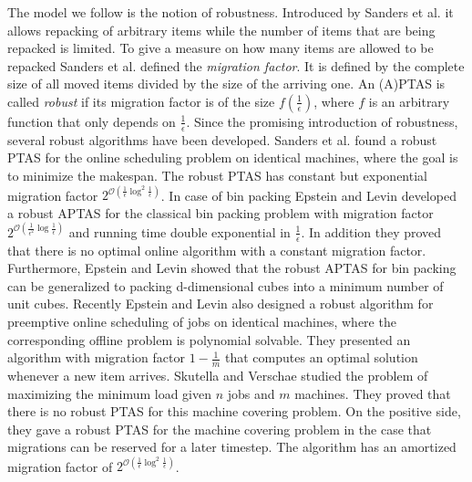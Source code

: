 \documentclass[a4paper,11pt]{article}
\begin{document}
The model we follow is the notion of robustness. Introduced by Sanders et al. \cite{sanders2009} it allows 
repacking of arbitrary items while the number of items that are being repacked is limited. To give a measure 
on how many items are allowed to
be repacked Sanders et al. \cite{sanders2009} defined the \emph{migration factor}.
It is defined by the complete size of all moved items divided by the size of the arriving one.
An (A)PTAS is called \emph{robust} if its migration factor is of the size $f(\frac{1}{\epsilon})$, where $f$ is
an arbitrary function that only depends on $\frac{1}{\epsilon}$.
Since the promising introduction of robustness, several robust algorithms have been developed.
Sanders et al. \cite{sanders2009} found a robust PTAS for the online scheduling problem  
on identical machines, where the goal is to minimize the makespan. The robust PTAS has
constant but exponential migration factor $2^{\mathcal{O}(\frac{1}{\epsilon} \log^2 \frac{1}{\epsilon})}$.
In case of bin packing
Epstein and Levin \cite{epstein2006robust} developed a robust APTAS for the classical bin packing problem
with migration factor $2^{\mathcal{O}(\frac{1}{\epsilon^2} \log \frac{1}{\epsilon})}$ and running time
double exponential in $\frac{1}{\epsilon}$.
In addition they proved that there is no optimal online algorithm with a constant migration factor.
Furthermore, Epstein and Levin \cite{epsteinu} showed that the robust APTAS for bin packing can 
be generalized to packing d-dimensional cubes into a minimum number of unit cubes.
Recently Epstein and Levin \cite{epstein2011} also designed a robust 
algorithm for preemptive online
scheduling of jobs on identical machines, where the corresponding offline problem is polynomial solvable.
They presented an algorithm with migration factor
$1-\frac{1}{m}$ that computes an optimal solution whenever a new item arrives.
Skutella and Verschae \cite{skutella2010} studied the problem of maximizing the minimum load given 
$n$ jobs and $m$ machines. They proved that there is no robust PTAS for this machine covering problem.
On the positive side, they gave a robust PTAS for the machine covering problem in the case that
migrations can be reserved for a later timestep. The algorithm has an amortized migration factor of
$2^{\mathcal{O}(\frac{1}{\epsilon} \log^2 \frac{1}{\epsilon})}$.
\end{document}
